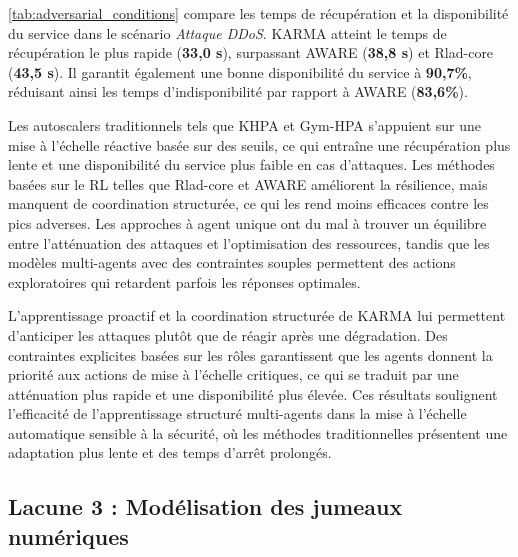 %
\autoref{tab:adversarial_conditions} compare les temps de récupération et la disponibilité du service dans le scénario \textit{Attaque DDoS}. KARMA atteint le temps de récupération le plus rapide (\textbf{33,0 s}), surpassant AWARE (\textbf{38,8 s}) et Rlad-core (\textbf{43,5 s}). Il garantit également une bonne disponibilité du service à \textbf{90,7\%}, réduisant ainsi les temps d'indisponibilité par rapport à AWARE (\textbf{83,6\%}).

Les autoscalers traditionnels tels que KHPA et Gym-HPA s'appuient sur une mise à l'échelle réactive basée sur des seuils, ce qui entraîne une récupération plus lente et une disponibilité du service plus faible en cas d'attaques. Les méthodes basées sur le RL telles que Rlad-core et AWARE améliorent la résilience, mais manquent de coordination structurée, ce qui les rend moins efficaces contre les pics adverses. Les approches à agent unique ont du mal à trouver un équilibre entre l'atténuation des attaques et l'optimisation des ressources, tandis que les modèles multi-agents avec des contraintes souples permettent des actions exploratoires qui retardent parfois les réponses optimales.

L'apprentissage proactif et la coordination structurée de KARMA lui permettent d'anticiper les attaques plutôt que de réagir après une dégradation. Des contraintes explicites basées sur les rôles garantissent que les agents donnent la priorité aux actions de mise à l'échelle critiques, ce qui se traduit par une atténuation plus rapide et une disponibilité plus élevée. Ces résultats soulignent l'efficacité de l'apprentissage structuré multi-agents dans la mise à l'échelle automatique sensible à la sécurité, où les méthodes traditionnelles présentent une adaptation plus lente et des temps d'arrêt prolongés.


\subsection{Lacune 3 : Modélisation des jumeaux numériques}

